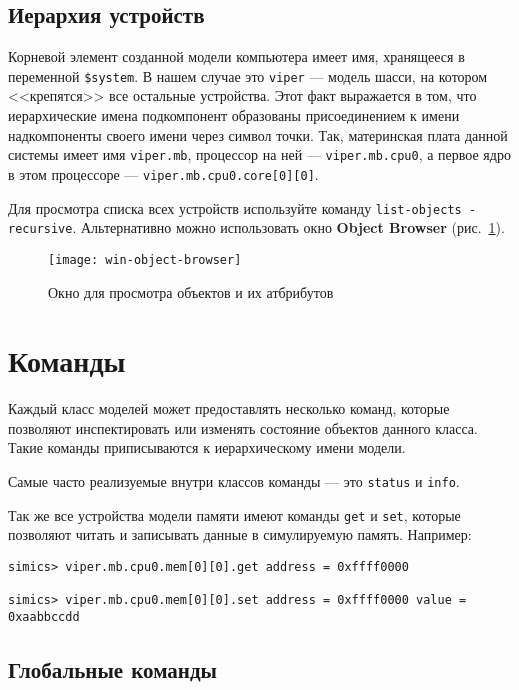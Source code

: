\subsection{Иерархия устройств}

Корневой элемент созданной модели компьютера имеет имя, хранящееся в переменной \texttt{\$system}. В нашем случае это \texttt{viper} --- модель шасси, на котором <<крепятся>> все остальные устройства. Этот факт выражается в том, что иерархические имена подкомпонент образованы присоединением к имени надкомпоненты своего имени через символ точки. Так, материнская плата данной системы имеет имя \texttt{viper.mb}, процессор на ней --- \texttt{viper.mb.cpu0}, а первое ядро в этом процессоре --- \texttt{viper.mb.cpu0.core[0][0]}.

Для просмотра списка всех устройств используйте команду \texttt{list-objects -recursive}. Альтернативно можно использовать окно \textbf{Object Browser} (рис.~\ref{fig:object-browser}).

\begin{figure}[htb]
    \centering
    \texttt{[image: win-object-browser]}
    \caption{Окно для просмотра объектов и их атбрибутов}
    \label{fig:object-browser}
\end{figure}

\section{Команды}

Каждый класс моделей может предоставлять несколько команд, которые позволяют инспектировать или изменять состояние объектов данного класса. Такие команды приписываются к иерархическому имени модели.

Самые часто реализуемые внутри классов команды --- это \texttt{status} и \texttt{info}.

Так же все устройства модели памяти имеют команды \texttt{get} и \texttt{set}, которые позволяют читать и записывать данные в симулируемую память. Например:

\begin{lstlisting}
simics> viper.mb.cpu0.mem[0][0].get address = 0xffff0000

simics> viper.mb.cpu0.mem[0][0].set address = 0xffff0000 value = 0xaabbccdd
\end{lstlisting}


\subsection{Глобальные команды}

